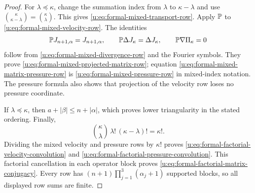 \begin{proof}
For \(\lambda\preceq\kappa\), change the summation index from \(\lambda\)
to \(\kappa-\lambda\) and use
\(\binom\kappa{\kappa-\lambda}=\binom\kappa\lambda\).  This gives
\eqref{u:eq:formal-mixed-transport-row}.  Apply \(\mathbb P\) to
\eqref{u:eq:formal-mixed-velocity-row}.  The identities
\[
 \mathbb P J_{n+1,\alpha}=J_{n+1,\alpha},
 \qquad
 \mathbb P\Delta J_\kappa=\Delta J_\kappa,
 \qquad
 \mathbb P\nabla\Pi_\kappa=0
\]
follow from \eqref{u:eq:formal-mixed-divergence-row} and the Fourier symbols.
They prove \eqref{u:eq:formal-mixed-projected-matrix-row}; equation
\eqref{u:eq:formal-mixed-matrix-pressure-row} is
\eqref{u:eq:formal-mixed-pressure-row} in mixed-index notation.  The pressure
formula also shows that projection of the velocity row loses no pressure
coordinate.

If \(\lambda\preceq\kappa\), then
\(a+|\beta|\le n+|\alpha|\), which proves lower triangularity in the stated
ordering.  Finally,
\[
 \binom\kappa\lambda\,\lambda!\,(\kappa-\lambda)!=\kappa!.
\]
Dividing the mixed velocity and pressure rows by \(\kappa!\) proves
\eqref{u:eq:formal-factorial-velocity-convolution} and
\eqref{u:eq:formal-factorial-pressure-convolution}.  This factorial cancellation in each operator block proves
\eqref{u:eq:formal-factorial-matrix-conjugacy}.  Every row has
\((n+1)\prod_{j=1}^3(\alpha_j+1)\) supported blocks, so all displayed row
sums are finite.
\end{proof}

